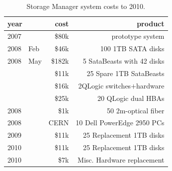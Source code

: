 
\begin{table}[!ht]
\begin{center}
\begin{tabular}{l|r|r}
year  & cost      & product \\\hline\hline
2007  &     \$80k & prototype system \\ \hline\hline
2008~~Feb&  \$46k & 100 1TB  SATA disks  \\\hline
2008~~May& \$182k & 5 SataBeasts with 42 disks  \\
         &  \$11k & 25 Spare 1TB SataBeasts \\
         &  \$16k & 2QLogic switches$+$hardware  \\ 
         &  \$25k & 20 QLogic dual HBAs \\\hline
2008     &   \$1k & 50 2m-optical fiber \\\hline
2008     & CERN   & 10 Dell PowerEdge 2950 PCs \\\hline
\hline
2009     &  \$11k & 25 Replacement 1TB disks \\ \hline
\hline
2010     &  \$11k & 25 Replacement 1TB disks \\ \hline
2010     &   \$7k & Misc. Hardware replacement  \\  \hline
\end{tabular}
\caption{Storage Manager system costs to 2010.}
\label{tab:costs}
\end{center}
\end{table}


